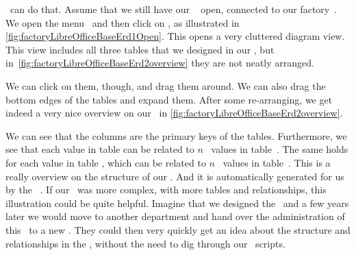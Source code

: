 \libreofficeBase\ can do that.
Assume that we still have our \libreofficeBase\  open, connected to our factory~\db.
We open the menu~ and then click on , as illustrated in \cref{fig:factoryLibreOfficeBaseErd1Open}.
This opens a very cluttered diagram view.
This view includes all three tables that we designed in our \db, but in~\cref{fig:factoryLibreOfficeBaseErd2overview} they are not neatly arranged.

We can click on them, though, and drag them around.
We can also drag the bottom edges of the tables and expand them.
After some re-arranging, we get indeed a very nice overview on our \db\ in \cref{fig:factoryLibreOfficeBaseErd2overview}.

We can see that the  columns are the primary keys of the tables.
Furthermore, we see that each  value in table  can be related to $n$~ values in table~.
The same holds for each  value in table , which can be related to $n$~ values in table~.
This  is a really overview on the structure of our \db.
And it is automatically generated for us by the \libreofficeBase\ .
If our \db\ was more complex, with more tables and relationships, this illustration could be quite helpful.
Imagine that we designed the \db\ and a few years later we would move to another department and hand over the administration of this \db\ to a new .
They could then very quickly get an idea about the structure and relationships in the \db, without the need to dig through our \sql\ scripts.%
%
\FloatBarrier%
\endhsection%
%
